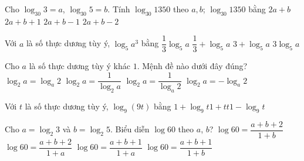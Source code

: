 \begin{ex}%
	 Cho $\log _{30} 3=a$, $\log _{30} 5=b$. Tính $\log _{30} 1350$ theo $a,b$; $\log _{30} 1350$ bằng
	 \choice
		 {$2a+b$}
		 {\True $2a+b+1$}
		 {$2a+b-1$}
		{$2a+b-2$} 
\end{ex}

\begin{ex}%
	Với $a$ là số thực dương tùy ý, $\log_5 a^3$  bằng
	\choice 
		{$\dfrac{1}{3}\log_5  a$}
		{$\dfrac{1}{3}+\log_5  a$}
		{$3+\log_5  a$}
		{\True $3\log_5  a$}
\end{ex}

\begin{ex}%
	Cho $a$ là số thực dương tùy ý khác  $1$. Mệnh đề nào dưới đây đúng?
	 \choice
		{$\log_2 a=\log_a 2$} 
		{$\log_2  a=\dfrac{1}{\log_2 a}$}
		 {\True $\log_2 a=\dfrac{1}{\log_a 2}$}
		{$\log_2  a=-\log_a 2$}
\end{ex}

\begin{ex}%
	Với $t$ là số thực dương tùy ý,  $\log_9(9t)$ bằng
	 \choice
		{\True $1+\log_9 t$}{$1+t$}{$t$}{$1-\log_9 t$} 
\end{ex}

\begin{ex}%
	Cho $a=\log_2 3$  và $b=\log_2 5$. Biểu diễn $\log 60$ theo $a$, $b$?
	 \choice
		 {\True $\log 60=\dfrac{a+b+2}{1+b}$}
		{$\log 60=\dfrac{a+b+2}{1+a}$} 
		{$\log  60=\dfrac{a+b+1}{1+a}$}
		 {$\log 60=\dfrac{a+b+1}{1+b}$}
\end{ex}


